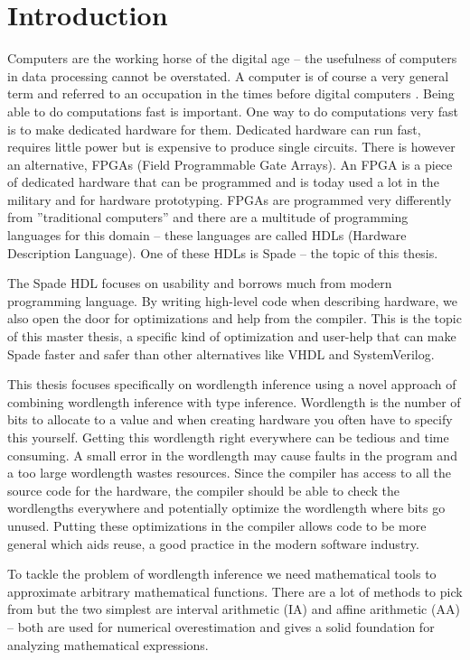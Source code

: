 \chapter{Introduction}
\label{chaIntro}
Computers are the working horse of the digital age -- the usefulness of computers in data processing cannot be overstated. A computer is of course a very general term and referred to an occupation in the times before digital computers \cite{src:ComputerOccupation}. Being able to do computations fast is important. One way to do computations very fast is to make dedicated hardware for them. Dedicated hardware can run fast, requires little power but is expensive to produce single circuits. There is however an alternative, FPGAs (Field Programmable Gate Arrays). An FPGA is a piece of dedicated hardware that can be programmed and is today used a lot in the military and for hardware prototyping. FPGAs are programmed very differently from ''traditional computers'' and there are a multitude of programming languages for this domain -- these languages are called HDLs (Hardware Description Language). One of these HDLs is Spade -- the topic of this thesis.

The Spade HDL focuses on usability and borrows much from modern programming language\cite{src:spadeSomething, src:spadeAnHDL}. By writing high-level code when describing hardware, we also open the door for optimizations and help from the compiler. This is the topic of this master thesis, a specific kind of optimization and user-help that can make Spade faster and safer than other alternatives like VHDL and SystemVerilog.

This thesis focuses specifically on wordlength inference using a novel approach of combining wordlength inference with type inference. Wordlength is the number of bits to allocate to a value and when creating hardware you often have to specify this yourself. Getting this wordlength right everywhere can be tedious and time consuming. A small error in the wordlength may cause faults in the program and a too large wordlength wastes resources.
Since the compiler has access to all the source code for the hardware, the compiler should be able to check the wordlengths everywhere and potentially optimize the wordlength where bits go unused. Putting these optimizations in the compiler allows code to be more general which aids reuse, a good practice in the modern software industry. 

To tackle the problem of wordlength inference we need mathematical tools to approximate arbitrary mathematical functions. There are a lot of methods to pick from but the two simplest are interval arithmetic (IA)\cite{src:affAri} and affine arithmetic (AA)\cite{src:affAri} -- both are used for numerical overestimation and gives a solid foundation for analyzing mathematical expressions.


